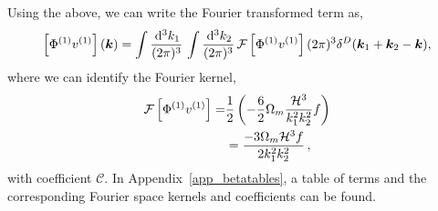 Using the above, we can write the Fourier transformed term as, 
\begin{equation}
	\left[\Phi^{(1)} v^{(1)}\right](\bm {k}) = \int \frac{\,\mathrm{d}^3 k_1}{(2\pi)^3} \, \int \frac{\,\mathrm{d}^3 k_2}{(2\pi)^3}\, \mathcal{F}\left[\Phi^{(1)} v^{(1)} \right] (2\pi)^3 \delta^D(\bm {k}_1+\bm {k}_2-\bm {k}), 
\end{equation}
where we can identify the Fourier kernel, 
\begin{align}
	\mathcal{F}\left[\Phi^{(1)} v^{(1)} \right] =& \frac{1}{2} \left( - \frac{6}{2} \Omega_m \frac{\mathcal{H}^3}{k_1^2 k_2^2} f \right) \\
	&= \frac{-3 \Omega_m \mathcal{H}^3 f}{2 k_1^2 k_2^2}\,,
\end{align}
with coefficient $\mathcal{C}$.
In Appendix~\ref{app_betatables}, a table of terms and the corresponding Fourier space kernels and coefficients can be found. 

